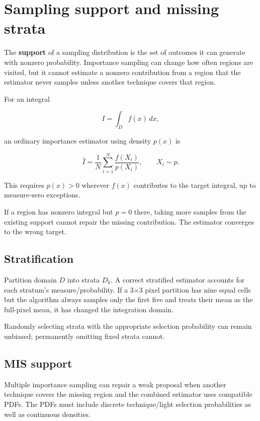 \hypertarget{appendix-10308c3d753e}{}\label{referencestart:appendix-10308c3d753e}
\section{Sampling support and missing strata}\label{appendix-10308c3d753e-sampling-support-and-missing-strata}

The \textbf{support} of a sampling distribution is the set of outcomes it can generate with nonzero probability. Importance sampling can change how often regions are visited, but it cannot estimate a nonzero contribution from a region that the estimator never samples unless another technique covers that region.

For an integral

\[
I=\int_D f(x)\,dx,
\]

an ordinary importance estimator using density \(p(x)\) is

\[
\hat I=\frac1N\sum_{i=1}^N\frac{f(X_i)}{p(X_i)},
\qquad X_i\sim p.
\]

This requires \(p(x)>0\) wherever \(f(x)\) contributes to the target integral, up to measure-zero exceptions.

If a region has nonzero integral but \(p=0\) there, taking more samples from the existing support cannot repair the missing contribution. The estimator converges to the wrong target.

\subsection{Stratification}\label{appendix-10308c3d753e-stratification}

Partition domain \(D\) into strata \(D_k\). A correct stratified estimator accounts for each stratum's measure/probability. If a 3×3 pixel partition has nine equal cells but the algorithm always samples only the first five and treats their mean as the full-pixel mean, it has changed the integration domain.

Randomly selecting strata with the appropriate selection probability can remain unbiased; permanently omitting fixed strata cannot.

\subsection{MIS support}\label{appendix-10308c3d753e-mis-support}

Multiple importance sampling can repair a weak proposal when another technique covers the missing region and the combined estimator uses compatible PDFs. The PDFs must include discrete technique/light selection probabilities as well as continuous densities.

